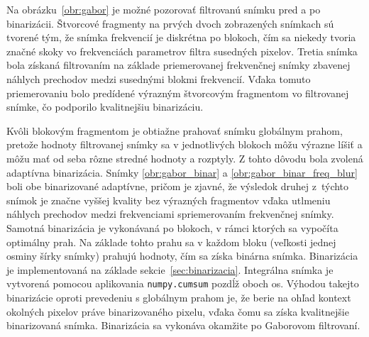   Na obrázku~{\ref{obr:gabor}}
  je možné pozorovať filtrovanú snímku pred a po binarizácii. Štvorcové fragmenty na prvých dvoch zobrazených snímkach sú tvorené tým, že snímka frekvencií je
  diskrétna po blokoch, čím sa niekedy tvoria značné skoky vo frekvenciách parametrov filtra susedných pixelov. Tretia snímka bola získaná filtrovaním na základe
  priemerovanej frekvenčnej snímky zbavenej náhlych prechodov medzi susednými blokmi frekvencií. Vďaka tomuto priemerovaniu bolo predídené výrazným štvorcovým
  fragmentom vo filtrovanej snímke, čo podporilo kvalitnejšiu binarizáciu.

  Kvôli blokovým fragmentom je obtiažne prahovať snímku globálnym prahom, pretože hodnoty filtrovanej snímky sa v jednotlivých blokoch môžu výrazne líšiť a môžu
  mať od seba rôzne stredné hodnoty a rozptyly. Z tohto dôvodu bola zvolená adaptívna binarizácia. Snímky \ref{obr:gabor_binar} a
  \ref{obr:gabor_binar_freq_blur} boli obe binarizované adaptívne, pričom je zjavné, že výsledok druhej z~týchto snímok je značne vyššej kvality bez výrazných
  fragmentov vďaka utlmeniu náhlych prechodov medzi frekvenciami spriemerovaním frekvenčnej snímky. Samotná binarizácia je vykonávaná po blokoch, v rámci ktorých
  sa vypočíta optimálny prah. Na základe tohto prahu sa v každom bloku (veľkosti jednej osminy šírky snímky) prahujú hodnoty,
  čím sa získa binárna snímka. Binarizácia je implementovaná na základe sekcie~{\ref{sec:binarizacia}}. Integrálna snímka je vytvorená pomocou
  aplikovania \texttt{numpy.cumsum} pozdĺž oboch os. Výhodou takejto binarizácie oproti prevedeniu
  s globálnym prahom je, že berie na ohľad kontext okolných pixelov práve binarizovaného pixelu, vďaka čomu sa získa kvalitnejšie binarizovaná snímka.
  Binarizácia sa vykonáva okamžite po Gaborovom filtrovaní.

